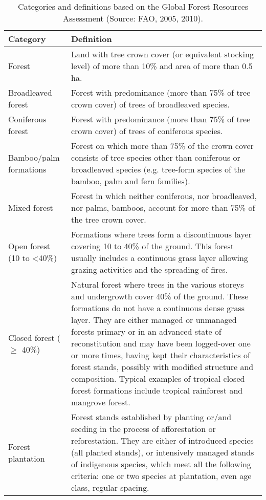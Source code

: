 \begin{spacing}{1.0}
\begin{longtable}[h!]{ p{3.5cm} p{10.5cm} }

    \caption[Global Forest Resources Assessment categories and definitions.]{Categories and definitions based on the Global Forest Resources Assessment (Source: FAO, 2005, 2010).}
    \label{tab: intro-table2.1}\\
    
    \toprule
    Category & Definition \\
    \midrule
    \endhead

    Forest & Land with tree crown cover (or equivalent stocking level) of more than 10\% and area of more than 0.5 ha. \\[5pt]
    Broadleaved forest & Forest with predominance (more than 75\% of tree crown cover) of trees of broadleaved species.\\[5pt]
    Coniferous forest & Forest with predominance (more than 75\% of tree crown cover) of trees of coniferous species.\\[5pt]
	Bamboo/palm formations & Forest on which more than 75\% of the crown cover consists of tree species other than coniferous or broadleaved species (e.g. tree-form species of the bamboo, palm and fern families).\\[5pt]
	Mixed forest & Forest in which neither coniferous, nor broadleaved, nor palms, bamboos, account for more than 75\% of the tree crown cover.\\[5pt]
	Open forest (10 to \textless 40\%) & Formations where trees form a discontinuous layer covering 10 to 40\% of the ground. This forest usually includes a continuous grass layer allowing grazing activities and the spreading of fires.\\[5pt]
	Closed forest ($\geq$ 40\%) & Natural forest where trees in the various storeys and undergrowth cover 40\% of the ground. These formations do not have a continuous dense grass layer. They are either managed or unmanaged forests primary or in an advanced state of reconstitution and may have been logged-over one or more times, having kept their characteristics of forest stands, possibly with modified structure and composition. Typical examples of tropical closed forest formations include tropical rainforest and mangrove forest.\\[5pt]
	Forest plantation & Forest stands established by planting or/and seeding in the process of afforestation or reforestation. They are either of introduced species (all planted stands), or intensively managed stands of indigenous species, which meet all the following criteria: one or two species at plantation, even age class, regular spacing.\\[5pt]

\end{longtable}
\end{spacing}
